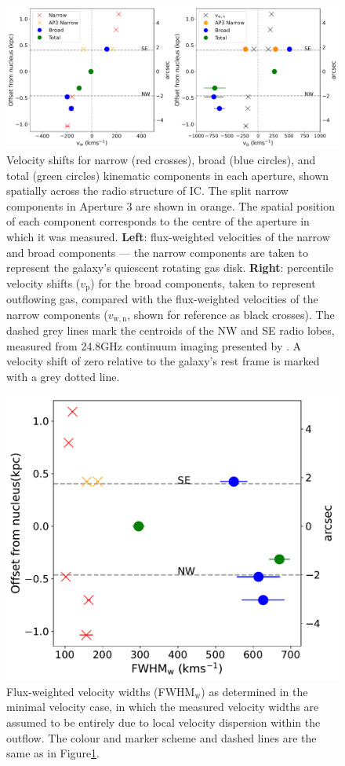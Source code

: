 \begin{figure}
    \centering
	\includegraphics[width=\linewidth]{figures/xshooter_ic5063/vmin_vmax.png}
	\caption[Velocity shifts of the warm-ionised gas along the radio structure of IC.]{Velocity shifts for narrow (red crosses), broad (blue circles), and total (green circles) kinematic components in each aperture, shown spatially across the radio structure of IC. The split narrow components in Aperture 3 are shown in orange. The spatial position of each component corresponds to the centre of the aperture in which it was measured. \textbf{Left}: flux-weighted velocities of the narrow and broad components --- the narrow components are taken to represent the galaxy's quiescent rotating gas disk. \textbf{Right}: percentile velocity shifts ($v_\mathrm{p}$) for the broad components, taken to represent outflowing gas, compared with the flux-weighted velocities of the narrow components ($v_\mathrm{w,n}$, shown for reference as black crosses). The dashed grey lines mark the centroids of the NW and SE radio lobes, measured from 24.8\;GHz continuum imaging presented by \citet{Morganti2007}. A velocity shift of zero relative to the galaxy's rest frame is marked with a grey dotted line.}
	\label{fig: xshooter_ic5063: velocities}
\end{figure}

\begin{figure}
    \centering
	\includegraphics[width=0.55\linewidth]{figures/xshooter_ic5063/vmin_widths.pdf}
	\caption[Velocity widths of the warm-ionised gas along the radio structure of IC.]{Flux-weighted velocity widths (FWHM$_\mathrm{w}$) as determined in the minimal velocity case, in which the measured velocity widths are assumed to be entirely due to local velocity dispersion within the outflow. The colour and marker scheme and dashed lines are the same as in Figure\;\ref{fig: xshooter_ic5063: velocities}.}
	\label{fig: xshooter_ic5063: fwhm}
\end{figure}

